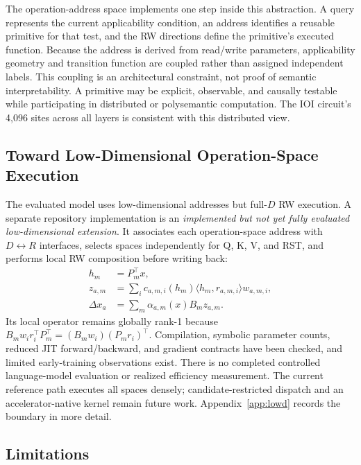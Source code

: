 \documentclass{article}
\begin{document}
The operation-address space implements one step inside this abstraction. A
query represents the current applicability condition, an address identifies a
reusable primitive for that test, and the RW directions define the primitive's
executed function. Because the address is derived from read/write parameters,
applicability geometry and transition function are coupled rather than assigned
independent labels. This coupling is an architectural constraint, not proof of
semantic interpretability. A primitive may be explicit, observable, and
causally testable while participating in distributed or polysemantic
computation. The IOI circuit's 4,096 sites across all layers is consistent with
this distributed view.

\subsection{Toward Low-Dimensional Operation-Space Execution}
\label{sec:future-low-d}

The evaluated model uses low-dimensional addresses but full-\(D\) RW
execution. A separate repository implementation is an \emph{implemented but
not yet fully evaluated low-dimensional extension}. It associates each
operation-space address with \(D\!\leftrightarrow\!R\) interfaces, selects
spaces independently for Q, K, V, and RST, and performs local RW composition
before writing back:
\begin{align}
h_m&=P_m^\top x,\\
z_{a,m}&=\sum_i c_{a,m,i}(h_m)
\langle h_m,r_{a,m,i}\rangle w_{a,m,i},\\
\Delta x_a&=\sum_m\alpha_{a,m}(x)B_m z_{a,m}.
\label{eq:lowd_preview}
\end{align}
Its local operator remains globally rank-1 because
\(B_m w_i r_i^\top P_m^\top=(B_mw_i)(P_mr_i)^\top\). Compilation,
symbolic parameter counts, reduced JIT forward/backward, and gradient
contracts have been checked, and limited early-training observations exist.
There is no completed controlled language-model evaluation or realized
efficiency measurement. The current reference path executes all spaces
densely; candidate-restricted dispatch and an accelerator-native kernel remain
future work. Appendix~\ref{app:lowd} records the boundary in more detail.

\subsection{Limitations}
\end{document}
